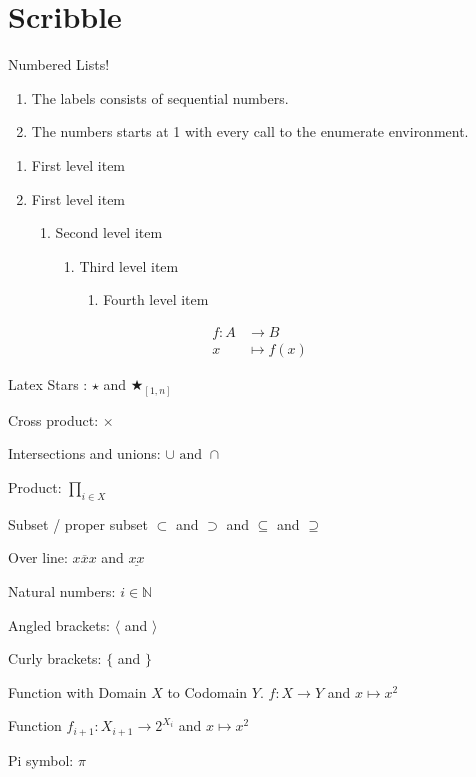 \documentclass[12pt]{article}
\theoremstyle{definition}
\begin{document}
\section{Scribble}
Numbered Lists! 
\begin{enumerate}
  \item The labels consists of sequential numbers.
  \item The numbers starts at 1 with every call to the enumerate environment.
\end{enumerate}

\begin{enumerate}
   \item First level item
   \item First level item
   \begin{enumerate}
     \item Second level item
     \begin{enumerate}
       \item Third level item
       \begin{enumerate}
         \item Fourth level item
       \end{enumerate}
     \end{enumerate}
   \end{enumerate}
 \end{enumerate}


\begin{align*}
f \colon A &\to B \\
x &\mapsto f(x)
\end{align*}


Latex Stars : $\star $ and $\bigstar_{[1,n]}$

Cross product: $\times$

Intersections and unions: $\cup \text{ and } \cap $

Product: $\prod_{i \in X}$

Subset / proper subset $\subset$ and $\supset$ and $\subseteq$ and $\supseteq$

Over line: $\overline{xxx}$ and $\underline{xx}$

Natural numbers: $i \in \mathbb{N} $

Angled brackets: $\langle$ and $\rangle$

Curly brackets: $\lbrace$ and $\rbrace$

Function with Domain $X$ to Codomain $Y$. $f: X \to Y$ and $x \mapsto x^2$

Function $f_{i+1}: X_{i+1} \to 2^{X_i}$ and $x \mapsto x^2$

Pi symbol: $\pi$
\end{document}
